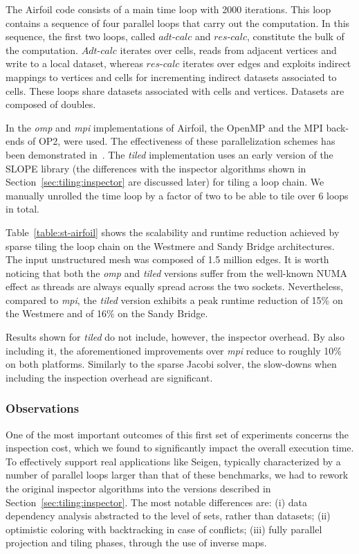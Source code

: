 The Airfoil code consists of a main time loop with 2000 iterations. This loop contains a sequence of four parallel loops that carry out the computation. In this sequence, the first two loops, called $adt$-$calc$ and $res$-$calc$, constitute the bulk of the computation. $Adt$-$calc$ iterates over cells, reads from adjacent vertices and write to a local dataset, whereas $res$-$calc$ iterates over edges and exploits indirect mappings to vertices and cells for incrementing indirect datasets associated to cells. These loops share datasets associated with cells and vertices. Datasets are composed of doubles.

In the {\em omp} and {\em mpi} implementations of Airfoil, the OpenMP and the MPI back-ends of OP2, were used. The effectiveness of these parallelization schemes has been demonstrated in~\cite{op2-main}. The {\em tiled} implementation uses an early version of the SLOPE library (the differences with the inspector algorithms shown in Section~\ref{sec:tiling:inspector} are discussed later) for tiling a loop chain. We manually unrolled the time loop by a factor of two to be able to tile over 6 loops in total. 


Table~\ref{table:st-airfoil} shows the scalability and runtime reduction achieved by sparse tiling the loop chain on the Westmere and Sandy Bridge architectures. The input unstructured mesh was composed of 1.5 million edges. It is worth noticing that both the {\em omp} and {\em tiled} versions suffer from the well-known NUMA effect as threads are always equally spread across the two sockets. Nevertheless, compared to {\em mpi}, the {\em tiled} version exhibits a peak runtime reduction of 15\% on the Westmere and of 16\% on the Sandy Bridge. 

Results shown for {\em tiled} do not include, however, the inspector overhead. By also including it, the aforementioned improvements over {\em mpi} reduce to roughly 10\% on both platforms. Similarly to the sparse Jacobi solver, the slow-downs when including the inspection overhead are significant.


\subsubsection{Observations}
\label{sec:tiling:bench:conc}
One of the most important outcomes of this first set of experiments concerns the inspection cost, which we found to significantly impact the overall execution time. To effectively support real applications like Seigen, typically characterized by a number of parallel loops larger than that of these benchmarks, we had to rework the original inspector algorithms into the versions described in Section~\ref{sec:tiling:inspector}. The most notable differences are: (i) data dependency analysis abstracted to the level of sets, rather than datasets; (ii) optimistic coloring with backtracking in case of conflicts; (iii) fully parallel projection and tiling phases, through the use of inverse maps. 

